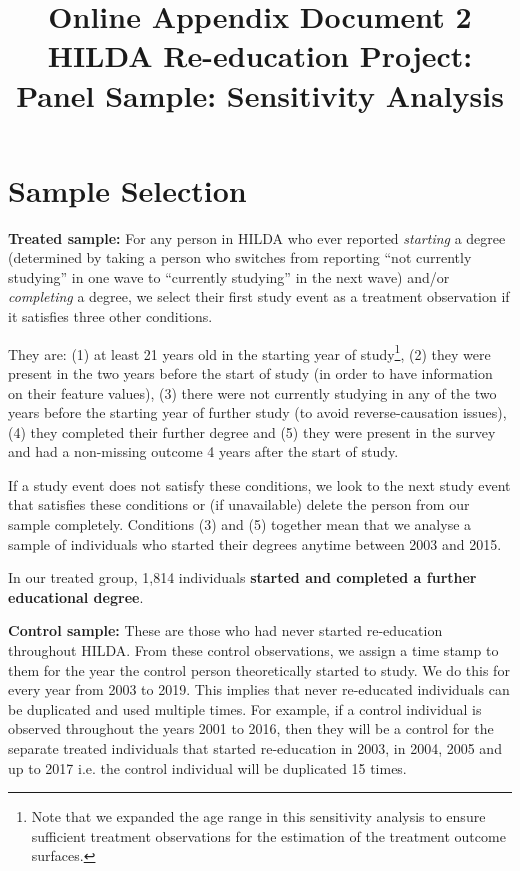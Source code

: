 \documentclass[12pt, a4paper]{article}
\title{Online Appendix Document 2 \\ \vspace{0.2cm} HILDA Re-education Project: Panel Sample: Sensitivity Analysis}
\author{ }
\date{ }
\begin{document}
\maketitle

\onehalfspacing

\section{Sample Selection}

\textbf{Treated sample:} For any person in HILDA who ever reported \textit{starting} a degree (determined by taking a person who switches from reporting “not currently studying” in one wave to “currently studying” in the next wave) and/or \textit{completing} a degree, we select their first study event as a treatment observation if it satisfies three other conditions.

They are: (1) at least 21 years old in the starting year of study\footnote{Note that we expanded the age range in this sensitivity analysis to ensure sufficient treatment observations for the estimation of the treatment outcome surfaces.}, (2) they were present in the two years before the start of study (in order to have information on their feature values), (3) there were not currently studying in any of the two years before the starting year of further study (to avoid reverse-causation issues), (4) they completed their further degree and (5) they were present in the survey and had a non-missing outcome 4 years after the start of study. 

If a study event does not satisfy these conditions, we look to the next study event that satisfies these conditions or (if unavailable) delete the person from our sample completely. Conditions (3) and (5) together mean that we analyse a sample of individuals who started their degrees anytime between 2003 and 2015.

In our treated group, 1,814 individuals \textbf{started and completed a further educational degree}. 

\textbf{Control sample:} These are those who had never started re-education throughout HILDA. From these control observations, we assign a time stamp to them for the year the control person theoretically started to study. We do this for every year from 2003 to 2019. This implies that never re-educated individuals can be duplicated and used multiple times. For example, if a control individual is observed throughout the years 2001 to 2016, then they will be a control for the separate treated individuals that started re-education in 2003, in 2004, 2005 and up to 2017 i.e. the control individual will be duplicated 15 times.
\end{document}
